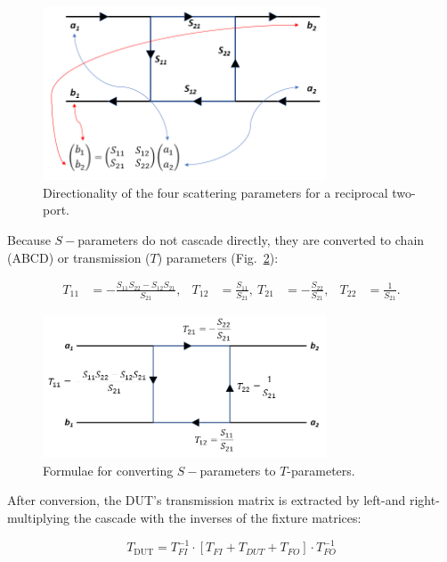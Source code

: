 \begin{figure}[H]
\centering
\includegraphics[width=0.75\textwidth]{Chapter_8/images/Lab_08_Figure2.png}
\caption{Directionality of the four scattering parameters for a reciprocal two-port. \cite{deembedding_part1} }
\label{Ch8_fig:2}
\end{figure}

Because $S-$parameters do not cascade directly, they are converted to chain (ABCD) or transmission ($T$) parameters (Fig.~\ref{Ch8_fig:3}):

\begin{align}
T_{11} &= -\frac{S_{11}S_{22}-S_{12}S_{21}}{S_{21}}, & T_{12} &= \frac{S_{11}}{S_{21}},\
T_{21} &= -\frac{S_{22}}{S_{21}}, & T_{22} &= \frac{1}{S_{21}}.
\end{align}

\begin{figure}[H]
\centering
\includegraphics[width=0.75\textwidth]{Chapter_8/images/Lab_08_Figure3.png}
\caption{Formulae for converting $S-$parameters to $T$-parameters. \cite{deembedding_part1} }
\label{Ch8_fig:3}
\end{figure}

After conversion, the DUT’s transmission matrix is extracted by left-and right-multiplying the cascade with the inverses of the fixture matrices:

\begin{equation}
	T_{\text{DUT}} = T_{FI}^{-1} \cdot [T_{FI} + T_{DUT}+ T_{FO}] \cdot T_{FO}^{-1}
	\label{eq:tdut}
\end{equation}

